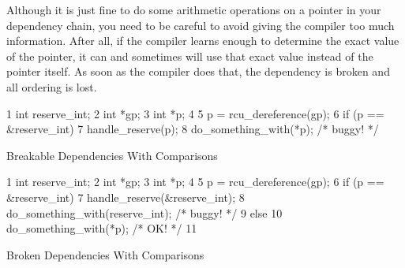 Although it is just fine to do some arithmetic operations on a pointer in
your dependency chain, you need to be careful to avoid giving the
compiler too much information.
After all, if the compiler learns enough to determine the exact value
of the pointer, it can and sometimes will use that exact value instead
of the pointer itself.
As soon as the compiler does that, the dependency is broken and all
ordering is lost.
\fi

\begin{listing}[tbp]
{ \scriptsize
\begin{verbbox}
 1 int reserve_int;
 2 int *gp;
 3 int *p;
 4
 5 p = rcu_dereference(gp);
 6 if (p == &reserve_int)
 7   handle_reserve(p);
 8 do_something_with(*p); /* buggy! */
\end{verbbox}
}
\centering
\theverbbox
\caption{Breakable Dependencies With Comparisons}
\label{lst:memorder:Breakable Dependencies With Comparisons}
\end{listing}

\begin{listing}[tbp]
{ \scriptsize
\begin{verbbox}
 1 int reserve_int;
 2 int *gp;
 3 int *p;
 4
 5 p = rcu_dereference(gp);
 6 if (p == &reserve_int) {
 7   handle_reserve(&reserve_int);
 8   do_something_with(reserve_int); /* buggy! */
 9 } else {
10   do_something_with(*p); /* OK! */
11 }
\end{verbbox}
}
\centering
\theverbbox
\caption{Broken Dependencies With Comparisons}
\label{lst:memorder:Broken Dependencies With Comparisons}
\end{listing}

